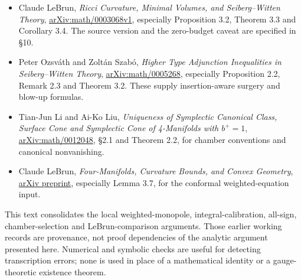 \documentclass[
  11pt,
]{article}
\providecommand{\tightlist}{%
  \setlength{\itemsep}{0pt}\setlength{\parskip}{0pt}}
\begin{document}
\begin{itemize}
\tightlist
\item
  Claude LeBrun, \emph{Ricci Curvature, Minimal Volumes, and
  Seiberg--Witten Theory},
  \href{https://arxiv.org/pdf/math/0003068}{arXiv:math/0003068v1},
  especially Proposition 3.2, Theorem 3.3 and Corollary 3.4. The source
  version and the zero-budget caveat are specified in §10.
\item
  Peter Ozsváth and Zoltán Szabó, \emph{Higher Type Adjunction
  Inequalities in Seiberg--Witten Theory},
  \href{https://arxiv.org/pdf/math/0005268}{arXiv:math/0005268},
  especially Proposition 2.2, Remark 2.3 and Theorem 3.2. These supply
  insertion-aware surgery and blow-up formulas.
\item
  Tian-Jun Li and Ai-Ko Liu, \emph{Uniqueness of Symplectic Canonical
  Class, Surface Cone and Symplectic Cone of 4-Manifolds with
  \(b^+=1\)},
  \href{https://arxiv.org/pdf/math/0012048}{arXiv:math/0012048}, §2.1
  and Theorem 2.2, for chamber conventions and canonical nonvanishing.
\item
  Claude LeBrun, \emph{Four-Manifolds, Curvature Bounds, and Convex
  Geometry}, \href{https://arxiv.org/pdf/math/0611450}{arXiv preprint},
  especially Lemma 3.7, for the conformal weighted-equation input.
\end{itemize}

This text consolidates the local weighted-monopole,
integral-calibration, all-sign, chamber-selection and LeBrun-comparison
arguments. Those earlier working records are provenance, not proof
dependencies of the analytic argument presented here. Numerical and
symbolic checks are useful for detecting transcription errors; none is
used in place of a mathematical identity or a gauge-theoretic existence
theorem.
\end{document}
